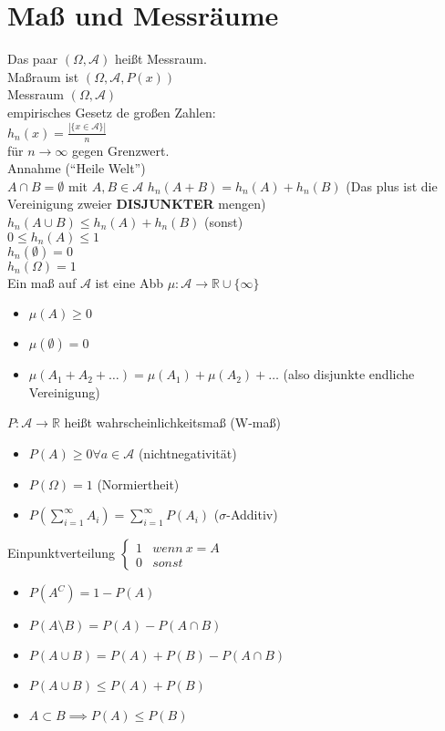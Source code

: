 \documentclass{article}
\begin{document}
	\section{Maß und Messräume}
	Das paar $(\Omega,\mathscr{A})$ heißt Messraum.\\
	Maßraum ist $(\Omega, \mathcal{A},P(x))$\\
	Messraum $(\Omega, \mathcal{A})$\\
	empirisches Gesetz de großen Zahlen:\\
	$h_n(x) = \frac{|\{x\in \mathscr{A}\}|}{n}$\\
	für $n\to\infty$ gegen Grenzwert.\\
	Annahme (``Heile Welt'')\\
	$A\cap B=\emptyset$ mit $A,B\in\mathscr{A}$
	$h_n(A+B) = h_n(A)+h_n(B)$ (Das plus ist die Vereinigung zweier \textbf{DISJUNKTER} mengen)\\
	$h_n(A\cup B)\leq h_n(A)+h_n(B)$ (sonst)\\
	$0\leq h_n(A)\leq 1$\\
	$h_n(\emptyset) =0$\\
	$h_n(\Omega) =1$\\
	Ein maß auf $\mathscr{A}$ ist  eine Abb $\mu:\mathscr{A}\to \mathbb{R}\cup\{\infty\}$
	\begin{itemize}
		\item $\mu(A)\geq 0$
		\item $\mu(\emptyset)=0$
		\item $\mu(A_1+A_2+\dots)=\mu(A_1)+\mu(A_2)+\dots$ (also disjunkte endliche Vereinigung)
	\end{itemize}
	$P:\mathscr{A}\to\mathbb{R}$ heißt wahrscheinlichkeitsmaß (W-maß)
	\begin{itemize}
		\item $P(A)\geq0\forall a\in\mathscr{A}$ (nichtnegativität)
		\item $P(\Omega)=1$ (Normiertheit)
		\item $P(\sum\limits^\infty_{i=1}A_i)=\sum\limits^\infty_{i=1}P(A_i)$ ($\sigma$-Additiv)
	\end{itemize}
	Einpunktverteilung $\begin{cases} 1& wenn\ x=A\\0&sonst\end{cases}$
	\begin{itemize}
		\item $P(A^C)=1-P(A)$
		\item $P(A\setminus B) = P(A)-P(A\cap B)$
		\item $P(A\cup B) = P(A)+P(B)-P(A\cap B)$
		\item $P(A\cup B)\leq P(A)+P(B)$
		\item $A\subset B\implies P(A)\leq P(B)$
	\end{itemize}
\end{document}
